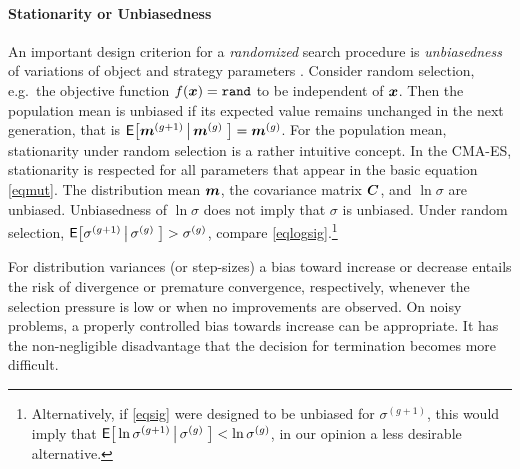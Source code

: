 \documentclass{article} %
\newenvironment{einschub}{%
\begin{small} \begin{quotation}\noindent}{%
  \vspace{0.5ex}\end{quotation}\end{small}%
}
\newcommand{\kom}[1]{}
\newcommand{\ve}[1]{\mathchoice{\mbox{\boldmath$\displaystyle#1$}}
  {\mbox{\boldmath$\textstyle#1$}} {\mbox{\boldmath$\scriptstyle#1$}}
  {\mbox{\boldmath$\scriptscriptstyle#1$}}}
\newcommand{\ma}[1]{\mathchoice{\mbox{\boldmath$\displaystyle#1$}}
  {\mbox{\boldmath$\textstyle#1$}} {\mbox{\boldmath$\scriptstyle#1$}}
  {\mbox{\boldmath$\scriptscriptstyle#1$}}}
\newcommand{\emphindex}[1]{\emph{#1}\index{#1}}
\newcommand{\sig}{\ensuremath{\sigma}}
\newcommand{\sigg}{\sigma^{(g)}}
\newcommand{\siggg}{\sigma^{(g+1)}}
\newcommand{\xmean}{\ensuremath{\ve{m}}}
\newcommand{\xmeang}{\ensuremath{\xmean^{(g)}}}
\newcommand{\xmeangg}{\ensuremath{\xmean^{(g+1)}}}
\newcommand{\Extext}[1]{{\mathsf{E}}\hspace{-0.0em}\big[#1\big]}
\begin{document}
\paragraph{Stationarity or Unbiasedness}\label{stationarity}
%
An important design criterion for a \emph{randomized} search procedure
is \emphindex{unbiasedness} of
variations of object and strategy parameters
\cite{Beyer:2001,Hansen:2001}\kom{not
  www-available:Hansen:1998,Beyer:2000}.  Consider random selection,
e.g.\ the objective function $f(\ve{x})= \mathtt{rand}$ to be
independent of $\ve{x}$. Then the population mean is unbiased if its
expected value remains unchanged in the next generation, that is
$\Extext{\xmeangg\left|\,\xmeang\right.}=\xmeang$. For the population
mean, stationarity under random selection is a rather intuitive
concept. In the CMA-ES, stationarity is respected for all parameters
that appear in the basic equation \eqref{eqmut}.  The distribution mean
$\xmean$, the covariance matrix $\ma{C}$, and $\ln\sig$ are unbiased.
Unbiasedness of $\ln\sig$ does not imply that $\sig$ is unbiased.
Under random selection,
$\Extext{\siggg\left|\,\sigg\right.}>\sigg$, compare
\eqref{eqlogsig}.\footnote{%
%
    Alternatively, if \eqref{eqsig} were designed to be unbiased
    for $\siggg$, this would imply that 
    $\Extext{\ln\siggg\left|\,\sigg\right.}<\ln\sigg$, in our opinion
    a less desirable alternative\kom{variant,option,version,possibility}. }
%
  
For distribution variances (or step-sizes) a bias toward increase or
decrease entails the risk of divergence or premature convergence,
respectively, whenever the selection pressure is low or when no 
improvements are observed. 
On noisy problems, a properly controlled bias towards increase can be
appropriate. It has the non-negligible disadvantage that the decision 
for termination becomes more difficult.

\kom%
{
\section{Conclusion}
We have introduced the CMA Evolution Strategy

Reduced to estimating mean, step-size, and distribution shape. 
} %

\end{document}
